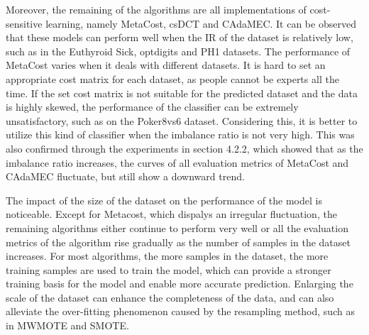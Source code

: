 Moreover, the remaining of the algorithms are all implementations of cost-sensitive learning, namely MetaCost, csDCT and CAdaMEC. It can be observed that these models can perform well when the IR of the dataset is relatively low, such as in the Euthyroid Sick, optdigits and PH1 datasets. The performance of MetaCost varies when it deals with different datasets. It is hard to set an appropriate cost matrix for each dataset, as people cannot be experts all the time. If the set cost matrix is not suitable for the predicted dataset and the data is highly skewed, the performance of the classifier can be extremely unsatisfactory, such as on the Poker8vs6 dataset. Considering this, it is better to utilize this kind of classifier when the imbalance ratio is not very high. This was also confirmed through the experiments in section 4.2.2, which showed that as the imbalance ratio increases, the curves of all evaluation metrics of MetaCost and CAdaMEC fluctuate, but still show a downward trend.


The impact of the size of the dataset on the performance of the model is noticeable. Except for Metacost, which dispalys an irregular fluctuation, the remaining algorithms either continue to perform very well or all the evaluation metrics of the algorithm rise gradually as the number of samples in the dataset increases. For most algorithms, the more samples in the dataset, the more training samples are used to train the model, which can provide a stronger training basis for the model and enable more accurate prediction. Enlarging the scale of the dataset can enhance the completeness of the data, and can also alleviate the over-fitting phenomenon caused by the resampling method, such as in MWMOTE and SMOTE.

